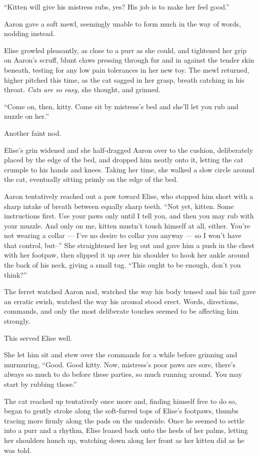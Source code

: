 ``Kitten will give his mistress rubs, yes? His job is to make her feel good.''

Aaron gave a soft mewl, seemingly unable to form much in the way of words, nodding instead.

Elise growled pleasantly, as close to a purr as she could, and tightened her grip on Aaron's scruff, blunt claws pressing through fur and in against the tender skin beneath, testing for any low pain tolerances in her new toy. The mewl returned, higher pitched this time, as the cat sagged in her grasp, breath catching in his throat. \emph{Cats are so easy,} she thought, and grinned.

``Come on, then, kitty. Come sit by mistress's bed and she'll let you rub and nuzzle on her.''

Another faint nod.

Elise's grin widened and she half-dragged Aaron over to the cushion, deliberately placed by the edge of the bed, and dropped him neatly onto it, letting the cat crumple to his hands and knees. Taking her time, she walked a slow circle around the cat, eventually sitting primly on the edge of the bed.

Aaron tentatively reached out a paw toward Elise, who stopped him short with a sharp intake of breath between equally sharp teeth. ``Not yet, kitten. Some instructions first. Use your paws only until I tell you, and then you may rub with your muzzle. And only on me, kitten mustn't touch himself at all, either. You're not wearing a collar --- I've no desire to collar you anyway --- so I won't have that control, but--'' She straightened her leg out and gave him a push in the chest with her footpaw, then slipped it up over his shoulder to hook her ankle around the back of his neck, giving a small tug. ``This ought to be enough, don't you think?''

The ferret watched Aaron nod, watched the way his body tensed and his tail gave an erratic swish, watched the way his arousal stood erect. Words, directions, commands, and only the most deliberate touches seemed to be affecting him strongly.

This served Elise well.

She let him sit and stew over the commands for a while before grinning and murmuring, ``Good. Good kitty. Now, mistress's poor paws are sore, there's always so much to do before these parties, so much running around. You may start by rubbing those.''

The cat reached up tentatively once more and, finding himself free to do so, began to gently stroke along the soft-furred tops of Elise's footpaws, thumbs tracing more firmly along the pads on the underside. Once he seemed to settle into a purr and a rhythm, Elise leaned back onto the heels of her palms, letting her shoulders hunch up, watching down along her front as her kitten did as he was told.

